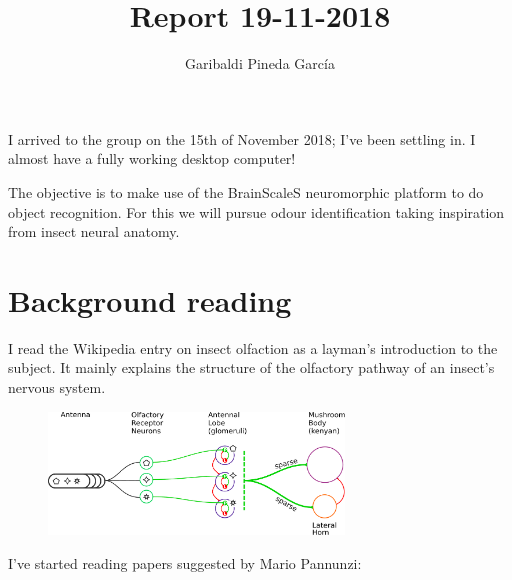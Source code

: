 \documentclass[11pt,a4paper]{article}
\author{Garibaldi Pineda Garc{\'i}a}
\title{Report 19-11-2018}
\begin{document}
  \maketitle
  I arrived to the group on the 15th of November 2018; I've been settling in. 
  I almost have a fully working desktop computer!
  
  The objective is to make use of the BrainScaleS neuromorphic platform to do object recognition. 
  For this we will pursue odour identification taking inspiration from insect neural anatomy. 
  
  \section{Background reading}
  I read the Wikipedia entry on insect olfaction as a layman's introduction to the subject. 
  It mainly explains the structure of the olfactory pathway of an insect's nervous system. 
  \begin{figure}[htb]
    \begin{center}
      \includegraphics[width=0.7\textwidth]{olfactory-pathway}
    \end{center}
  \end{figure}


  I've started reading papers suggested by Mario Pannunzi:
  
\end{document}
